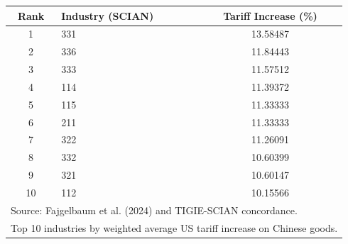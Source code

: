 \begin{tabular}{clc}
\toprule
Rank & Industry (SCIAN) & Tariff Increase (\%) \\
\midrule
1&331&13.58487\\
2&336&11.84443\\
3&333&11.57512\\
4&114&11.39372\\
5&115&11.33333\\
6&211&11.33333\\
7&322&11.26091\\
8&332&10.60399\\
9&321&10.60147\\
10&112&10.15566\\
\bottomrule
\multicolumn{3}{l}{\footnotesize Source: Fajgelbaum et al. (2024) and TIGIE-SCIAN concordance.} \\
\multicolumn{3}{l}{\footnotesize Top 10 industries by weighted average US tariff increase on Chinese goods.} \\
\end{tabular}
